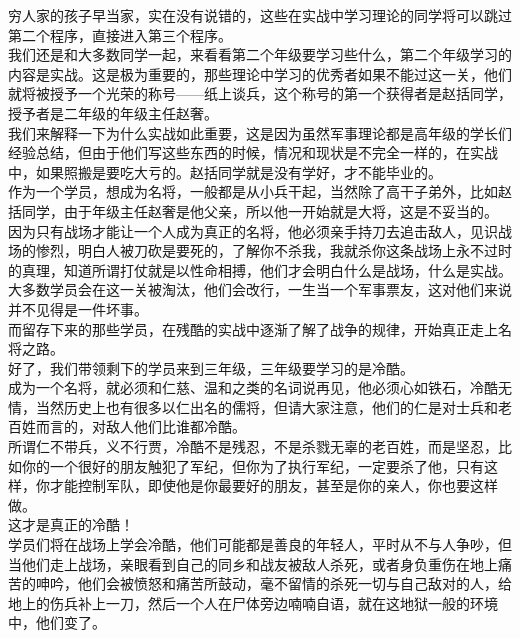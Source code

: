 \begin{multicols}{\theparacolNo}
穷人家的孩子早当家，实在没有说错的，这些在实战中学习理论的同学将可以跳过第二个程序，直接进入第三个程序。\\

我们还是和大多数同学一起，来看看第二个年级要学习些什么，第二个年级学习的内容是实战。这是极为重要的，那些理论中学习的优秀者如果不能过这一关，他们就将被授予一个光荣的称号——纸上谈兵，这个称号的第一个获得者是赵括同学，授予者是二年级的年级主任赵奢。\\

我们来解释一下为什么实战如此重要，这是因为虽然军事理论都是高年级的学长们经验总结，但由于他们写这些东西的时候，情况和现状是不完全一样的，在实战中，如果照搬是要吃大亏的。赵括同学就是没有学好，才不能毕业的。\\

作为一个学员，想成为名将，一般都是从小兵干起，当然除了高干子弟外，比如赵括同学，由于年级主任赵奢是他父亲，所以他一开始就是大将，这是不妥当的。\\

因为只有战场才能让一个人成为真正的名将，他必须亲手持刀去追击敌人，见识战场的惨烈，明白人被刀砍是要死的，了解你不杀我，我就杀你这条战场上永不过时的真理，知道所谓打仗就是以性命相搏，他们才会明白什么是战场，什么是实战。\\

大多数学员会在这一关被淘汰，他们会改行，一生当一个军事票友，这对他们来说并不见得是一件坏事。\\

而留存下来的那些学员，在残酷的实战中逐渐了解了战争的规律，开始真正走上名将之路。\\

好了，我们带领剩下的学员来到三年级，三年级要学习的是冷酷。\\

成为一个名将，就必须和仁慈、温和之类的名词说再见，他必须心如铁石，冷酷无情，当然历史上也有很多以仁出名的儒将，但请大家注意，他们的仁是对士兵和老百姓而言的，对敌人他们比谁都冷酷。\\

所谓仁不带兵，义不行贾，冷酷不是残忍，不是杀戮无辜的老百姓，而是坚忍，比如你的一个很好的朋友触犯了军纪，但你为了执行军纪，一定要杀了他，只有这样，你才能控制军队，即使他是你最要好的朋友，甚至是你的亲人，你也要这样做。\\

这才是真正的冷酷！\\

学员们将在战场上学会冷酷，他们可能都是善良的年轻人，平时从不与人争吵，但当他们走上战场，亲眼看到自己的同乡和战友被敌人杀死，或者身负重伤在地上痛苦的呻吟，他们会被愤怒和痛苦所鼓动，毫不留情的杀死一切与自己敌对的人，给地上的伤兵补上一刀，然后一个人在尸体旁边喃喃自语，就在这地狱一般的环境中，他们变了。\\


\end{multicols}

